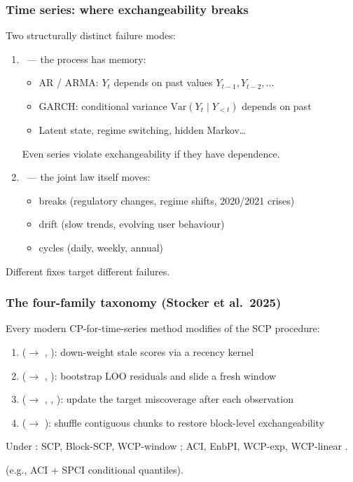 \documentclass[11pt, aspectratio=169, xcolor={dvipsnames}, usepdftitle=false]{beamer}
\begin{document}
\begin{frame}
\frametitle{Time series: where exchangeability breaks}
Two structurally distinct failure modes:
\begin{enumerate}
\item {}~--- the process has memory:
\begin{itemize}
\item AR / ARMA: $Y_t$ depends on past values $Y_{t-1}, Y_{t-2}, \ldots$
\item GARCH: conditional variance $\text{Var}(Y_t \mid Y_{<t})$ depends on past
\item Latent state, regime switching, hidden Markov\ldots
\end{itemize}
\quad Even  series violate exchangeability if they have dependence.
\item {}~--- the joint law itself moves:
\begin{itemize}
\item {} breaks (regulatory changes, regime shifts, 2020/2021 crises)
\item {} drift (slow trends, evolving user behaviour)
\item {} cycles (daily, weekly, annual)
\end{itemize}
\end{enumerate}
 Different fixes target different failures.
\end{frame}

\begin{frame}
\frametitle{The four-family taxonomy (Stocker et al.\ 2025)}
Every modern CP-for-time-series method modifies  of the SCP procedure:
\begin{enumerate}
\item {} ($\to$ , ): down-weight stale scores via a recency kernel
\item {} ($\to$ , ): bootstrap LOO residuals and slide a fresh window
\item {} ($\to$ , , ): update the target miscoverage after each observation
\item {} ($\to$ ): shuffle contiguous chunks to restore block-level exchangeability
\end{enumerate}
Under : SCP, Block-SCP, WCP-window ; ACI, EnbPI, WCP-exp, WCP-linear .

 (e.g., ACI + SPCI conditional quantiles).
\end{frame}
\end{document}
